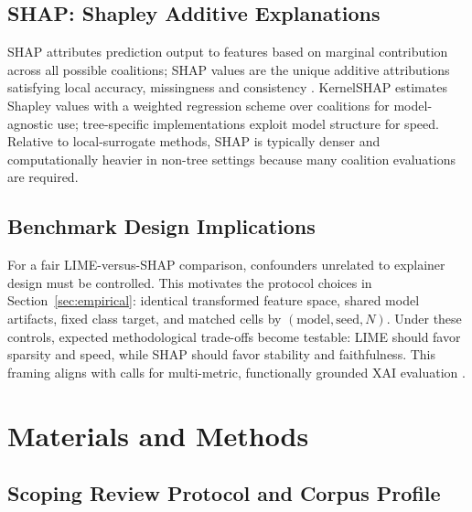\documentclass[10pt,a4paper,twoside]{article}
\begin{document}
\subsection{SHAP: Shapley Additive Explanations}

SHAP attributes prediction output to features based on marginal
contribution across all possible coalitions; SHAP values are the unique
additive attributions satisfying local accuracy, missingness and consistency
\citep{lundberg2017unified}. KernelSHAP
estimates Shapley values with a weighted regression scheme over coalitions
for model-agnostic use; tree-specific implementations exploit model
structure for speed. Relative to local-surrogate methods, SHAP is
typically denser and computationally heavier in non-tree settings because
many coalition evaluations are required.

\subsection{Benchmark Design Implications}

For a fair LIME-versus-SHAP comparison, confounders unrelated to explainer
design must be controlled. This motivates the protocol choices in
Section~\ref{sec:empirical}: identical transformed feature space, shared
model artifacts, fixed class target, and matched cells by
$(\mathrm{model}, \mathrm{seed}, N)$. Under these controls, expected
methodological trade-offs become testable: LIME should favor sparsity and
speed, while SHAP should favor stability and faithfulness. This framing
aligns with calls for multi-metric, functionally grounded XAI evaluation
\citep{pawlicki2024metrics,canha2025benchmark}.



\section{Materials and Methods}
\label{sec:methods}


\subsection{Scoping Review Protocol and Corpus Profile}
\label{sec:scoping}
\end{document}
